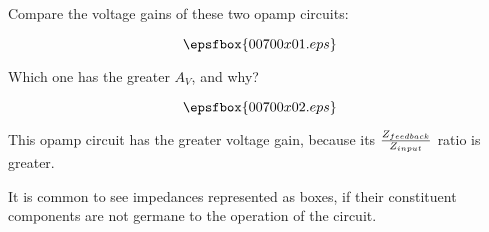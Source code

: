 

Compare the voltage gains of these two opamp circuits:

$$\epsfbox{00700x01.eps}$$

Which one has the greater $A_V$, and why?







$$\epsfbox{00700x02.eps}$$

This opamp circuit has the greater voltage gain, because its $Z_{feedback} \over Z_{input}$ ratio is greater.







It is common to see impedances represented as boxes, if their constituent components are not germane to the operation of the circuit.




